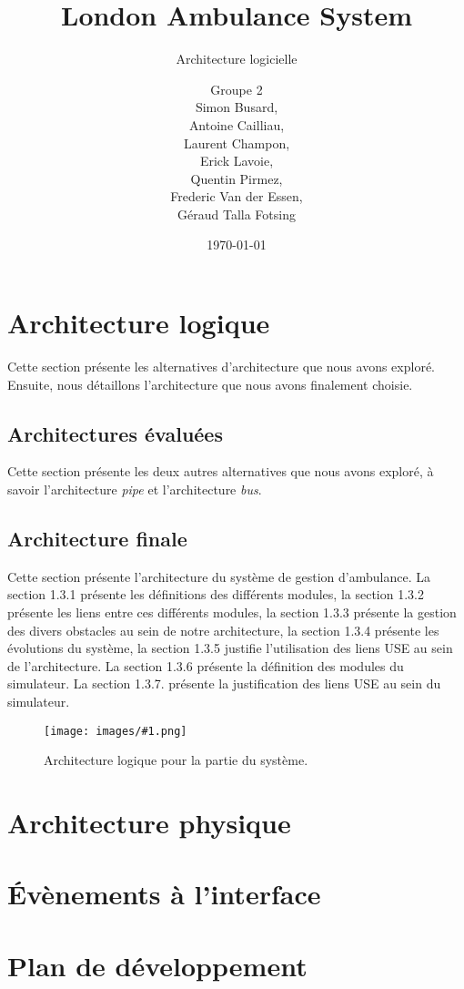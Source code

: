 \documentclass{report}
\title{London Ambulance System}
\subtitle{Architecture logicielle}
\author{\normalsize{Groupe 2}\\
\footnotesize{
Simon Busard, \\
Antoine Cailliau, \\
Laurent Champon,\\
Erick Lavoie, \\
Quentin Pirmez,\\
Frederic Van der Essen, \\
Géraud Talla Fotsing}}
\date{\today}
\newlength{\realtextwidth}
\newcommand{\insertfiguremargin}[2]{
	\begin{figure}[!h]
	\noindent\begin{minipage}[!h]{\marginparsep+\marginparwidth+\marginparpush+\textwidth}
		\begin{minipage}[t]{\realtextwidth}
			\vspace{0pt}
			\texttt{[image: images/\#1.png]}
		\end{minipage}
		\hspace{\marginparsep}
		\begin{minipage}[t]{\marginparwidth+\marginparpush}
			\vspace{0pt}
			\setcaptionwidth{\marginparwidth+\marginparpush}
			\caption{#2}\label{fig:#1}
			\setcaptionwidth{0.9\realtextwidth}
		\end{minipage}		
	\end{minipage}
	\end{figure}

}
\begin{document}
\setlength{\parskip}{1em}
\startdocument

\maketitle
\setcounter{tocdepth}{1}
\tableofcontents

\chapter{Architecture logique}
	
	Cette section présente les alternatives d'architecture que nous
	avons exploré. Ensuite, nous détaillons l'architecture que nous
	avons finalement choisie.

	\section{Architectures évaluées }
		
		Cette section présente les deux autres alternatives que nous 
		avons exploré, à savoir l'architecture \textit{pipe} et l'architecture
		\textit{bus}.
	
		
		
	
	\section{Architecture finale}
		Cette section présente l'architecture du système de gestion d'ambulance.
		La section 1.3.1 présente les définitions des différents modules, 
		la section 1.3.2 présente les liens entre ces différents modules, 
		la section 1.3.3 présente la gestion des divers obstacles au sein 
		de notre architecture, la section 1.3.4 présente les évolutions du 
		système, la section 1.3.5 justifie l'utilisation des liens USE au sein
		de l'architecture. La section 1.3.6 présente la définition
		des modules du simulateur. La section 1.3.7. présente la 
		justification des liens USE au sein du simulateur.
	
		\insertfiguremargin{logic-sys}{Architecture logique pour la partie du 
		système.}
		
		
		
		
		
		
\chapter{Architecture physique}
	

\chapter{Évènements à l'interface}
	

\chapter{Plan de développement}
	
\end{document}
